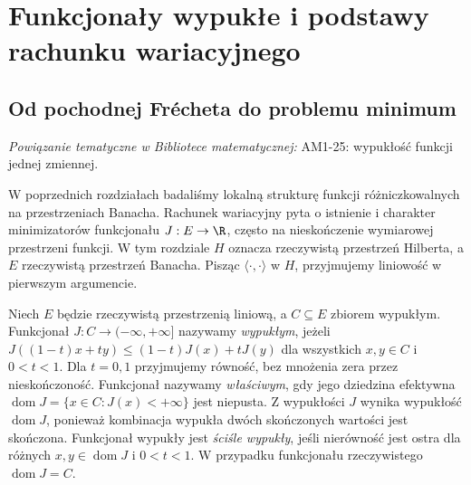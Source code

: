 \setcounter{section}{15}
\section{Funkcjonały wypukłe i podstawy rachunku wariacyjnego}
\label{sec:wariacyjny16}

\providecommand{\atlasref}[2]{#2}


\subsection{Od pochodnej Frécheta do problemu minimum}

\noindent\emph{Powiązanie tematyczne w Bibliotece matematycznej:} \atlasref{AM1-25::ma1:def:convex-function}{AM1-25: wypukłość funkcji jednej zmiennej}.


W poprzednich rozdziałach badaliśmy lokalną strukturę funkcji
różniczkowalnych na przestrzeniach Banacha. Rachunek wariacyjny pyta
o istnienie i charakter minimizatorów funkcjonału $J:E\to\R$,
często na nieskończenie wymiarowej przestrzeni funkcji.
W tym rozdziale $H$ oznacza rzeczywistą przestrzeń Hilberta,
a $E$ rzeczywistą przestrzeń Banacha. Pisząc $\langle\cdot,\cdot\rangle$
w $H$, przyjmujemy liniowość w pierwszym argumencie.

\begin{definicja}
\label{def:convex-fun16}
Niech $E$ będzie rzeczywistą przestrzenią liniową,
a $C\subseteq E$ zbiorem wypukłym.
Funkcjonał $J:C\to(-\infty,+\infty]$ nazywamy
\emph{wypukłym}, jeżeli
$J((1-t)x+ty)\le(1-t)J(x)+tJ(y)$ dla wszystkich $x,y\in C$
i $0<t<1$. Dla $t=0,1$ przyjmujemy równość, bez
mnożenia zera przez nieskończoność.
Funkcjonał nazywamy \emph{właściwym}, gdy jego dziedzina
efektywna $\operatorname{dom}J=\{x\in C:J(x)<+\infty\}$
jest niepusta. Z wypukłości $J$ wynika wypukłość
$\operatorname{dom}J$, ponieważ kombinacja wypukła
dwóch skończonych wartości jest skończona.
Funkcjonał wypukły jest \emph{ściśle wypukły}, jeśli nierówność
jest ostra dla różnych $x,y\in\operatorname{dom}J$
i $0<t<1$. W przypadku funkcjonału rzeczywistego
$\operatorname{dom}J=C$.
\end{definicja}

